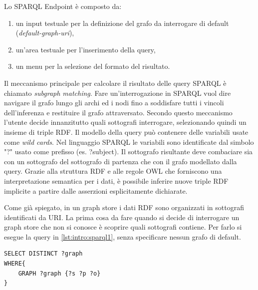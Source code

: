 Lo SPARQL Endpoint è composto da:
\begin{enumerate}
\item un input testuale per la definizione del grafo da interrogare di default (\textit{default-graph-uri}),
\item un'area testuale per l'inserimento della query,
\item un menu per la selezione del formato del risultato.
\end{enumerate}
Il meccanismo principale per calcolare il risultato delle query SPARQL è chiamato \textit{subgraph matching}.
Fare un'interrogazione in SPARQL vuol dire navigare il grafo lungo gli archi ed i nodi fino a soddisfare tutti i vincoli dell’inferenza e restituire il grafo attraversato.
Secondo questo meccanismo l'utente decide innanzitutto quali sottografi interrogare, selezionando quindi un insieme di triple RDF. Il modello della query può contenere delle variabili usate come \textit{wild cards}. Nel linguaggio SPARQL le variabili sono identificate dal simbolo "?" usato come prefisso (es. ?subject).
Il sottografo risultante deve combaciare sia con un sottografo del sottografo di partenza che con il grafo modellato dalla query.
Grazie alla struttura RDF e alle regole OWL che forniscono una interpretazione semantica per i dati, è possibile inferire nuove triple RDF implicite a partire dalle asserzioni esplicitamente dichiarate.

Come già spiegato, in un graph store i dati RDF sono organizzati in sottografi identificati da URI.
La prima cosa da fare quando si decide di interrogare un graph store che non si conosce è scoprire quali sottografi contiene. Per farlo si esegue la query in \ref{lst:intro:sparql1}, senza specificare nessun grafo di default.\\ 



\lstset{ basicstyle=\LSTfont, columns=fullflexible, xleftmargin=5mm, framexleftmargin=5mm, numbers=left, stepnumber=1, breaklines=true, breakatwhitespace=false, numberstyle=\footnotesize, numbersep=5pt, tabsize=2, frame=lines, captionpos=b}
   
\begin{lstlisting}[frame=single, caption={Individuare i grafi salvati in un graph store.},label={lst:intro:sparql1},]  
SELECT DISTINCT ?graph
WHERE{
	GRAPH ?graph {?s ?p ?o}
}
\end{lstlisting}

